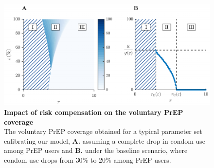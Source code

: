 \documentclass[12pt]{article}
\begin{document}
\newpage
\begin{figure}[H]
	\centering	
	\includegraphics{Figures/Fig_S5}
	\caption[Impact of risk compensation on the voluntary PrEP coverage]{%
		{\bf {} Impact of risk compensation on the voluntary PrEP coverage}\\
	The voluntary PrEP coverage obtained for a typical parameter set calibrating our model, \textbf{A.} assuming a complete drop in condom use among PrEP users and \textbf{B.} under the baseline scenario, where condom use drops from $30\%$ to $20\%$ among PrEP users.}
	\label{fig:p_hat_CondomDrop}
\end{figure}


\newpage
\renewcommand{\refname}{\section{References}}
\setlength{\labelsep}{1.5em}

 
\end{document}
